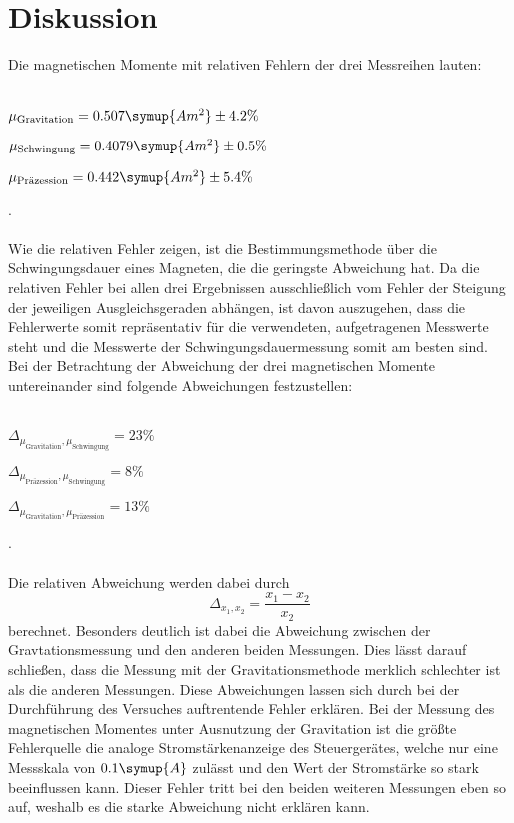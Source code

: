\section{Diskussion}
\label{sec:Diskussion}
Die magnetischen Momente mit relativen Fehlern der drei Messreihen lauten:
\\ \\
\centerline{$\mu_\text{Gravitation} = 0.507 \symup{A m^2} \pm 4.2\% $ }
\centerline{$\mu_\text{Schwingung} =  0.4079 \symup{A m^2} \pm 0.5\% $}
\centerline{$\mu_\text{Präzession} = 0.442  \symup{A m^2} \pm 5.4\%$ }.
\\ \\
Wie die relativen Fehler zeigen, ist die Bestimmungsmethode über die Schwingungsdauer eines Magneten, die die geringste 
Abweichung hat. Da die relativen Fehler bei allen drei Ergebnissen ausschließlich vom Fehler der Steigung der jeweiligen
Ausgleichsgeraden abhängen, ist davon auszugehen, dass die Fehlerwerte somit repräsentativ für die verwendeten, aufgetragenen
Messwerte steht und die Messwerte der Schwingungsdauermessung somit am besten sind. 
Bei der Betrachtung der Abweichung der drei magnetischen Momente untereinander sind folgende Abweichungen festzustellen:
\\ \\
\centerline{$\Delta_\text{$\mu_\text{Gravitation}, \mu_\text{Schwingung}$} = 23 \%$}
\centerline{$\Delta_\text{$\mu_\text{Präzession}, \mu_\text{Schwingung}$} = 8 \%$}
\centerline{$\Delta_\text{$\mu_\text{Gravitation}, \mu_\text{Präzession}$} = 13 \%$}.
\\ \\
Die relativen Abweichung werden dabei durch 
\begin{equation}
    \Delta_\text{$x_1,x_2$} = \frac{x_1 - x_2}{x_2}
\end{equation}
berechnet. Besonders deutlich ist dabei die Abweichung zwischen der Gravtationsmessung und den anderen beiden Messungen. Dies lässt
darauf schließen, dass die Messung mit der Gravitationsmethode merklich schlechter ist als die anderen Messungen.
Diese Abweichungen lassen sich durch bei der Durchführung des Versuches auftrentende Fehler erklären.
Bei der Messung des magnetischen Momentes unter Ausnutzung der Gravitation ist die größte Fehlerquelle die analoge Stromstärkenanzeige
des Steuergerätes, welche nur eine Messskala von $0.1 \symup{A}$ zulässt und den Wert der Stromstärke so stark beeinflussen kann.
Dieser Fehler tritt bei den beiden weiteren Messungen eben so auf, weshalb es die starke Abweichung nicht erklären kann.
